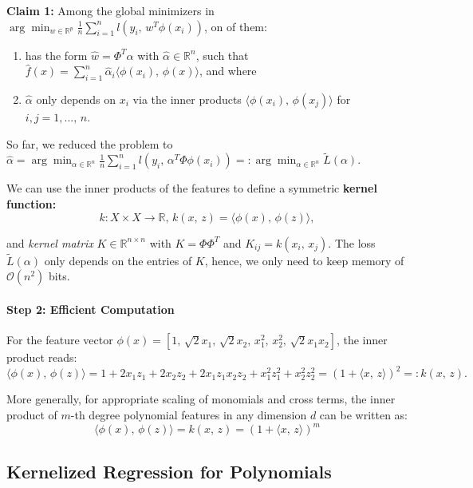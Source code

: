 \documentclass[a4paper]{extarticle}
\begin{document}
\begin{cbox}
    \textbf{Claim 1:} Among the global minimizers in $\arg \min_{w \in \mathbb{R}^p} \frac{1}{n} \sum_{i = 1}^n l(y_i, \, w^T \phi(x_i))$, on of them:
    \begin{enumerate}
        \item has the form $\hat{w} = \Phi^T\hat{\alpha}$ with $\hat{\alpha} \in \mathbb{R}^n$, such that $\hat{f}(x) = \sum_{i = 1}^n \hat{\alpha}_i \langle \phi(x_i), \, \phi(x) \rangle$, and where
        \item $\hat{\alpha}$ only depends on $x_i$ via the inner products $\langle \phi(x_i), \, \phi(x_j) \rangle$ for $i,j = 1,..., \, n.$
    \end{enumerate}
\end{cbox}

So far, we reduced the problem to $\hat{\alpha} = \arg \min_{\alpha \in \mathbb{R}^n} \frac{1}{n} \sum_{i = 1}^n l(y_i, \, \alpha^T\Phi \phi(x_i)) =: \arg \min_{\alpha \in \mathbb{R}^n} \tilde{L}(\alpha)$.

We can use the inner products of the features to define a symmetric \textbf{kernel function:}
\[
    k : X \times X \to \mathbb{R}, \, k(x, \, z) = \langle \phi(x), \, \phi(z) \rangle,
\]

and \textit{kernel matrix} $K \in \mathbb{R}^{n \times n}$ with $K = \Phi \Phi^T$ and $K_{ij} = k(x_i, \, x_j)$. The loss $\tilde{L}(\alpha)$ only depends on the entries of $K$, hence, we only need to keep memory of $\mathcal{O}(n^2)$ bits.

\paragraph{Step 2: Efficient Computation} 

For the feature vector $\phi(x) = [1, \, \sqrt{2}x_1, \, \sqrt{2}x_2, \, x_1^2, \, x_2^2, \, \sqrt{2}x_1x_2]$, the inner product reads:
\[
    \langle \phi(x), \, \phi(z) \rangle = 1 + 2x_1z_1 + 2x_2z_2 + 2x_1z_1x_2z_2 + x_1^2z_1^2 + x_2^2z_2^2 = (1 + \langle x, \, z \rangle)^2 =: k(x, \, z).
\]

More generally, for appropriate scaling of monomials and cross terms, the inner product of $m$-th degree polynomial features in any dimension $d$ can be written as:
\[
    \langle \phi(x), \, \phi(z) \rangle = k(x, \, z) = (1 + \langle x, \, z \rangle)^m
\]

\subsection{Kernelized Regression for Polynomials}
\end{document}
